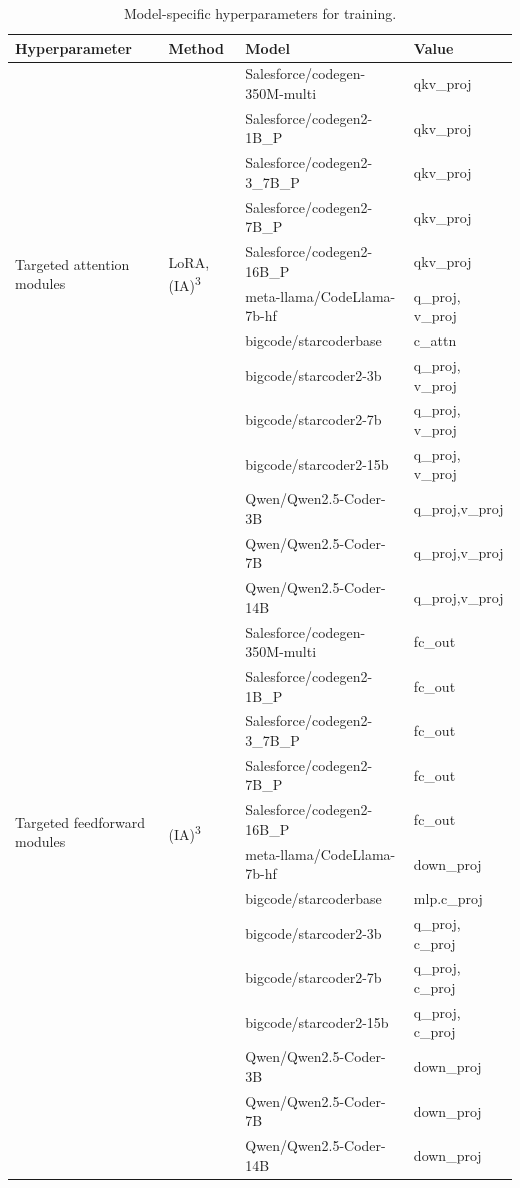 \documentclass[12pt]{book}
\begin{document}
\begin{table}[htb]
    \centering
    \small
    \caption{Model-specific hyperparameters for training.}\label{tab:model-specific-hyperparameters-training}
    \begin{tabularx}{\textwidth}{p{3cm}Xll}
        \toprule
        \textbf{Hyperparameter} & \textbf{Method} & \textbf{Model} & \textbf{Value}\\
        \midrule
        \multirow{10}{3cm}{Targeted attention modules} & \multirow{10}{*}{LoRA, (IA)\textsuperscript{3}} & Salesforce/codegen-350M-multi & qkv\_proj \\
        & & Salesforce/codegen2-1B\_P & qkv\_proj \\
        & & Salesforce/codegen2-3\_7B\_P & qkv\_proj \\
        & & Salesforce/codegen2-7B\_P & qkv\_proj \\
        & & Salesforce/codegen2-16B\_P & qkv\_proj \\
        & & meta-llama/CodeLlama-7b-hf & q\_proj, v\_proj \\
        & & bigcode/starcoderbase & c\_attn \\
        & & bigcode/starcoder2-3b & q\_proj, v\_proj \\
        & & bigcode/starcoder2-7b & q\_proj, v\_proj \\
        & & bigcode/starcoder2-15b & q\_proj, v\_proj \\
        & & Qwen/Qwen2.5-Coder-3B & q\_proj,v\_proj \\
        & & Qwen/Qwen2.5-Coder-7B & q\_proj,v\_proj \\
        & & Qwen/Qwen2.5-Coder-14B & q\_proj,v\_proj \\
        \midrule
        \multirow{10}{3cm}{Targeted feedforward modules} & \multirow{10}{*}{(IA)\textsuperscript{3}} & Salesforce/codegen-350M-multi & fc\_out \\
        & & Salesforce/codegen2-1B\_P & fc\_out \\
        & & Salesforce/codegen2-3\_7B\_P & fc\_out \\
        & & Salesforce/codegen2-7B\_P & fc\_out \\
        & & Salesforce/codegen2-16B\_P & fc\_out \\
        & & meta-llama/CodeLlama-7b-hf & down\_proj \\
        & & bigcode/starcoderbase & mlp.c\_proj \\
        & & bigcode/starcoder2-3b & q\_proj, c\_proj \\
        & & bigcode/starcoder2-7b & q\_proj, c\_proj \\
        & & bigcode/starcoder2-15b & q\_proj, c\_proj \\
        & & Qwen/Qwen2.5-Coder-3B & down\_proj \\
        & & Qwen/Qwen2.5-Coder-7B & down\_proj \\
        & & Qwen/Qwen2.5-Coder-14B & down\_proj \\
       \bottomrule
    \end{tabularx}
\end{table}
\end{document}
